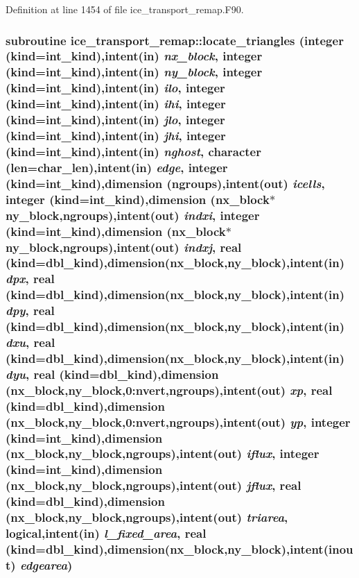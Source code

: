 Definition at line 1454 of file ice\_\-transport\_\-remap.F90.\hypertarget{namespaceice__transport__remap_a5ed79661ddd56d26d4e863b7ec1b9a0a}{
\subsubsection[{locate\_\-triangles}]{\setlength{\rightskip}{0pt plus 5cm}subroutine ice\_\-transport\_\-remap::locate\_\-triangles (integer (kind=int\_\-kind),intent(in) {\em nx\_\-block}, \/  integer (kind=int\_\-kind),intent(in) {\em ny\_\-block}, \/  integer (kind=int\_\-kind),intent(in) {\em ilo}, \/  integer (kind=int\_\-kind),intent(in) {\em ihi}, \/  integer (kind=int\_\-kind),intent(in) {\em jlo}, \/  integer (kind=int\_\-kind),intent(in) {\em jhi}, \/  integer (kind=int\_\-kind),intent(in) {\em nghost}, \/  character (len=char\_\-len),intent(in) {\em edge}, \/  integer (kind=int\_\-kind),dimension (ngroups),intent(out) {\em icells}, \/  integer (kind=int\_\-kind),dimension (nx\_\-block$\ast$ny\_\-block,ngroups),intent(out) {\em indxi}, \/  integer (kind=int\_\-kind),dimension (nx\_\-block$\ast$ny\_\-block,ngroups),intent(out) {\em indxj}, \/  real (kind=dbl\_\-kind),dimension(nx\_\-block,ny\_\-block),intent(in) {\em dpx}, \/  real (kind=dbl\_\-kind),dimension(nx\_\-block,ny\_\-block),intent(in) {\em dpy}, \/  real (kind=dbl\_\-kind),dimension(nx\_\-block,ny\_\-block),intent(in) {\em dxu}, \/  real (kind=dbl\_\-kind),dimension(nx\_\-block,ny\_\-block),intent(in) {\em dyu}, \/  real (kind=dbl\_\-kind),dimension (nx\_\-block,ny\_\-block,0:nvert,ngroups),intent(out) {\em xp}, \/  real (kind=dbl\_\-kind),dimension (nx\_\-block,ny\_\-block,0:nvert,ngroups),intent(out) {\em yp}, \/  integer (kind=int\_\-kind),dimension (nx\_\-block,ny\_\-block,ngroups),intent(out) {\em iflux}, \/  integer (kind=int\_\-kind),dimension (nx\_\-block,ny\_\-block,ngroups),intent(out) {\em jflux}, \/  real (kind=dbl\_\-kind),dimension (nx\_\-block,ny\_\-block,ngroups),intent(out) {\em triarea}, \/  logical,intent(in) {\em l\_\-fixed\_\-area}, \/  real (kind=dbl\_\-kind),dimension(nx\_\-block,ny\_\-block),intent(inout) {\em edgearea})}}
\label{namespaceice__transport__remap_a5ed79661ddd56d26d4e863b7ec1b9a0a}


